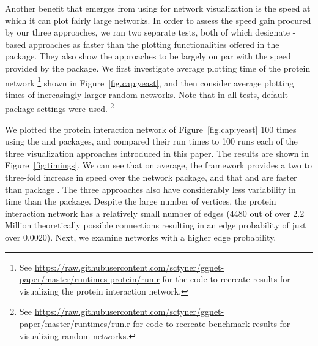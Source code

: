 Another benefit that emerges from using  for network visualization is the speed at which it can plot fairly large networks. In order to assess the speed gain procured by our three approaches, we ran two separate tests, both of which designate -based approaches as faster than the plotting functionalities offered in the  package. They also show the  approaches to be largely on par with the speed provided by the  package. We first investigate average plotting time
of the protein network%
\footnote{See \url{https://raw.githubusercontent.com/sctyner/ggnet-paper/master/runtimes-protein/run.r} for the code to recreate results for visualizing the protein interaction network.} 
shown in Figure~\ref{fig.cap:yeast}, and then consider average plotting times of increasingly larger random networks. Note that in all tests, default package settings were used.%
\footnote{See \url{https://raw.githubusercontent.com/sctyner/ggnet-paper/master/runtimes/run.r} for code to recreate benchmark results for visualizing random networks.}
%


We plotted the protein interaction network of Figure~\ref{fig.cap:yeast} 100 times using the  and  packages, and compared their run times to 100 runs each of the three visualization approaches introduced in this paper. The results are shown in Figure~\ref{fig:timings}. We can see that on average, the  framework provides a two to three-fold increase in speed over the network package, and that  and  are faster than package . The three  approaches also have considerably less variability in time than the  package.
Despite the large number of vertices, the protein interaction network has a relatively small number of edges (4480 out of over 2.2 Million theoretically possible connections resulting in an edge probability of just over 0.0020). Next, we examine networks with a higher edge probability.

